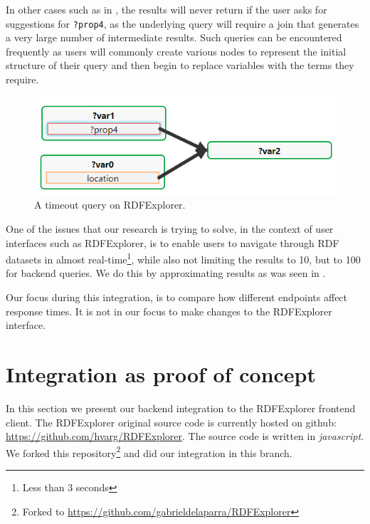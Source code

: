 In other cases such as in , the results will never return if the user asks for suggestions for \texttt{?prop4}, as the underlying query will require a join that generates a very large number of intermediate results. Such queries can be encountered frequently as users will commonly create various nodes to represent the initial structure of their query and then begin to replace variables with the terms they require. 

\begin{figure}[h]
    \centering
        \includegraphics[width=0.7\linewidth]{imagenes/timeout query.png}
        \caption{A timeout query on RDFExplorer.}
        \label{fig:rdfExplorer_timeout}
\end{figure}

One of the issues that our research is trying to solve, in the context of user interfaces such as RDFExplorer, is to enable users to navigate through RDF datasets in almost real-time\footnote{Less than 3 seconds}, while also not limiting the results to 10, but to 100 for backend queries. We do this by approximating results as was seen in .

Our focus during this integration, is to compare how different endpoints affect response times. It is not in our focus to make changes to the RDFExplorer interface.


\section{Integration as proof of concept}

In this section we present our backend integration to the RDFExplorer frontend client. The RDFExplorer original source code is currently hosted on github: \url{https://github.com/hvarg/RDFExplorer}. The source code is written in \textit{javascript}. We forked this repository\footnote{Forked to \url{https://github.com/gabrieldelaparra/RDFExplorer}} and did our integration in this branch. 

